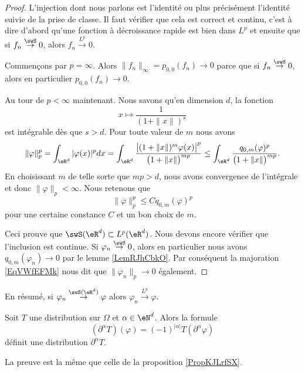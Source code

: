 \begin{proof}
    L'injection dont nous parlons est l'identité ou plus précisément l'identité suivie de la prise de classe. Il faut vérifier que cela est correct et continu, c'est à dire d'abord qu'une fonction à décroissance rapide est bien dans \( L^p\) et ensuite que si \( f_n\stackrel{\swS}{\to}0\), alors \( f_n\stackrel{L^p}{\to}0\).
    
    Commençons par \( p=\infty\). Alors \( \| f_n \|_{\infty}=p_{0,0}(f_n)\to 0\) parce que si \( f_n\stackrel{\swS}{\to}0\), alors en particulier \( p_{0,0}(f_n)\to 0\).

    Au tour de \( p<\infty\) maintenant. Nous savons qu'en dimension \( d\), la fonction
    \begin{equation}
        x\mapsto \frac{1}{ (1+\| x \|)^s }
    \end{equation}
    est intégrable dès que \( s>d\).
    Pour toute valeur de \( m\) nous avons
    \begin{equation}
        \| \varphi \|_p^p=\int_{\eR^d}| \varphi(x) |^pdx=\int_{\eR^d}\frac{ \big|    (1+\| x \|)^m\varphi(x)   \big|^p }{ \big( 1+\| x \| \big)^{mp} }\leq\int_{\eR^d}\frac{q_{0,m}(\varphi)^p}{ \big( 1+\| x \| \big)^{mp} }.
    \end{equation}
    En choisissant \( m\) de telle sorte que \( mp>d\), nous avons convergence de l'intégrale et donc \( \| \varphi \|_p<\infty\). Nous retenons que
    \begin{equation}    \label{EqVWfEFMk}
        \| \varphi \|_p^p\leq Cq_{0,m}(\varphi)^p
    \end{equation}
    pour une certaine constance \( C\) et un bon choix de \( m\).

    Ceci prouve que \( \swS(\eR^d)\subset L^p(\eR^d)\). Nous devons encore vérifier que l'inclusion est continue. Si \( \varphi_n\stackrel{\swS}{\to}0\), alors en particulier nous avons \( q_{0,m}(\varphi_n)\to 0\) par le lemme \ref{LemRJhCbkO}. Par conséquent la majoration \eqref{EqVWfEFMk} nous dit que \( \| \varphi_n \|_p\to 0\) également.

\end{proof}
En résumé, si \( \varphi_n\stackrel{\swS(\eR^d)}{\to}\varphi\) alors \( \varphi_n\stackrel{L^p}{\to}\varphi\).

\begin{proposition} \label{PropVLEWffA}
    Soit \( T\) une distribution sur \( \Omega\) et \( \alpha\in \eN^d\). Alors la formule
    \begin{equation}
        (\partial^{\alpha}T)(\varphi)=(-1)^{| \alpha |}T(\partial^{\alpha}\varphi)
    \end{equation}
    définit une distribution \( \partial^{\alpha}T\).
\end{proposition}
La preuve est la même que celle de la proposition \ref{PropKJLrfSX}.

